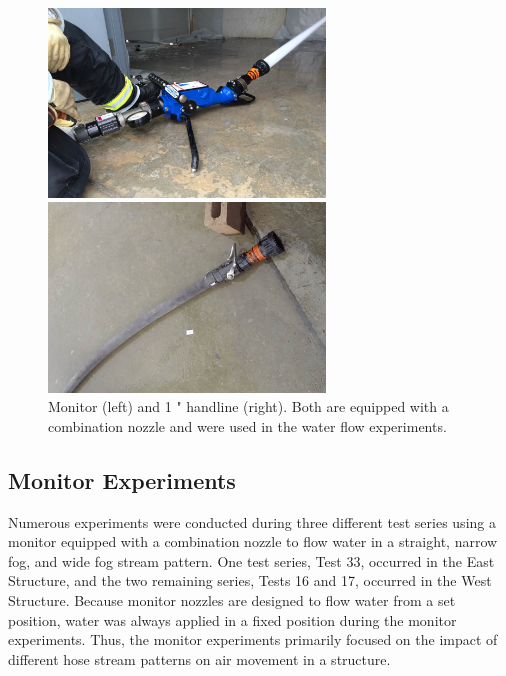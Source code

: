\documentclass[12pt,oneside]{book}
\begin{document}
\begin{figure}[!ht]
\minipage{3in}
\begin{center}
	\includegraphics[width=2.9in]{../Pictures/monitor}
\end{center} 
\endminipage \hfill
\minipage{3in}
\begin{center}
	\includegraphics[width=2.9in]{../Pictures/handline}
\end{center}
\endminipage \hfill
\caption[Monitor and Handline Equipped with Combination Nozzle]{Monitor (left) and 1 " handline (right). Both are equipped with a combination nozzle and were used in the water flow experiments.}
\label{fig:monitor+handline}
\end{figure}
\FloatBarrier

\subsection{Monitor Experiments}
\label{subsec:monitor_procedure}
Numerous experiments were conducted during three different test series using a monitor equipped with a combination nozzle to flow water in a straight, narrow fog, and wide fog stream pattern. One test series, Test 33, occurred in the East Structure, and the two remaining series, Tests 16 and 17, occurred in the West Structure. Because monitor nozzles are designed to flow water from a set position, water was always applied in a fixed position during the monitor experiments. Thus, the monitor experiments primarily focused on the impact of different hose stream patterns on air movement in a structure.
\end{document}
